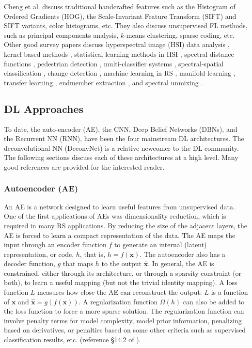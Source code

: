 \documentclass[12pt]{spieman}
\begin{document}
\begin{spacing}{1}
Cheng et al. \cite{Cheng} discuss traditional handcrafted features such as the Histogram of Ordered Gradients (HOG), the Scale-Invariant Feature Transform (SIFT) and SIFT variants, color histograms, etc. They also discuss unsupervised FL methods, such as principal components analysis, $k$-means clustering, sparse coding, etc. Other good survey papers discuss hyperspectral image (HSI) data analysis \cite{Bioucas-dias2013} , kernel-based methods \cite{Camps-Valls2005Kernel} , statistical learning methods in HSI \cite{camps2013advances} , spectral distance functions \cite{deborah2015comprehensive} , pedestrian detection \cite{dollar2012pedestrian} , multi-classifier systems \cite{du2012multiple} , spectral-spatial classification \cite{fauvel2013advances} , change detection \cite{hussain2013change, jianya2008review} , machine learning in RS \cite{lary2016machine} , manifold learning \cite{lunga2014manifold} , transfer learning \cite{pan2010survey} , endmember extraction \cite{plaza2004quantitative} , and spectral unmixing \cite{keshava2002spectral, keshava2003survey, parente2010survey, plaza2011recent, shi2014incorporating} .

\subsection{DL Approaches}
To date, the auto-encoder (AE), the CNN, Deep Belief Networks (DBNs), and the Recurrent NN (RNN), have been the four mainstream DL architectures. The deconvolutional NN (DeconvNet) is a relative newcomer to the DL community. The following sections discuss each of these architectures at a high level. Many good references are provided for the interested reader.

\subsubsection{Autoencoder (AE)}
An AE is a network designed to learn useful features from unsupervised data. One of the first applications of AEs was dimensionality reduction, which is required in many RS applications. By reducing the size of the adjacent layers, the AE is forced to learn a compact representation of the data. The AE maps the input through an encoder function $f$ to generate an internal (latent) representation, or code, $h$, that is, $h = f(\textbf{x})$. The autoencoder also has a decoder function, $g$ that maps $h$ to the output $\hat{\textbf{x}}$. In general, the AE is constrained, either through its architecture, or through a sparsity constraint (or both), to learn a useful mapping (but not the trivial identity mapping). A loss function $L$ measures how close the AE can reconstruct the output: $L$ is a function of $\textbf{x}$ and $\hat{\textbf{x}} = g(f(\textbf{x}))$. A regularization function $\Omega(h)$ can also be added to the loss function to force a more sparse solution. The regularization function can involve penalty terms for model complexity, model prior information, penalizing based on derivatives, or penalties based on some other criteria such as supervised classification results, etc. (reference \S 14.2 of \cite{goodfellow2016deep} ). 


\end{spacing}
\end{document}
